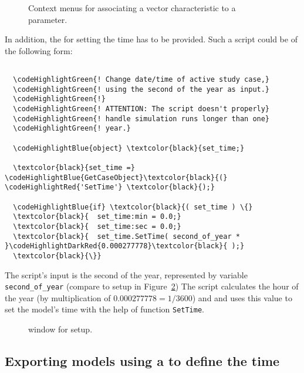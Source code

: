 \begin{figure}[h!]
\vspace*{2em}
\caption{Context menus for associating a vector characteristic to a parameter.}
\label{fig:add_characteristic_vector}
\end{figure}

\clearpage

In addition, the \dplscript for setting the time has to be provided.
Such a script could be of the following form:

\begin{Verbatim}[frame=single,commandchars=\\\{\}]

  \codeHighlightGreen{! Change date/time of active study case,}
  \codeHighlightGreen{! using the second of the year as input.}
  \codeHighlightGreen{!}
  \codeHighlightGreen{! ATTENTION: The script doesn't properly}
  \codeHighlightGreen{! handle simulation runs longer than one}
  \codeHighlightGreen{! year.}

  \codeHighlightBlue{object} \textcolor{black}{set_time;}

  \textcolor{black}{set_time =} \codeHighlightBlue{GetCaseObject}\textcolor{black}{(} \codeHighlightRed{'SetTime'} \textcolor{black}{);}

  \codeHighlightBlue{if} \textcolor{black}{( set_time ) \{}
  \textcolor{black}{  set_time:min = 0.0;}
  \textcolor{black}{  set_time:sec = 0.0;}
  \textcolor{black}{  set_time.SetTime( second_of_year * }\codeHighlightDarkRed{0.000277778}\textcolor{black}{ );}
  \textcolor{black}{\}}

\end{Verbatim}
The script's input is the second of the year, represented by variable \texttt{second\_of\_year} (compare to \dplscript setup in Figure~\ref{fig:dpl_script_setup})
The script calculates the hour of the year (by multiplication of $0.000277778 = 1 / 3600$) and and uses this value to set the model's time with the help of function \texttt{SetTime}.
\begin{figure}[h!]
\vspace*{1ex}
\vspace{-2mm}
\caption{\pf window for \dplscript setup.}
\label{fig:dpl_script_setup}
\end{figure}

\subsection{Exporting models using a \dplscript to define the time}

